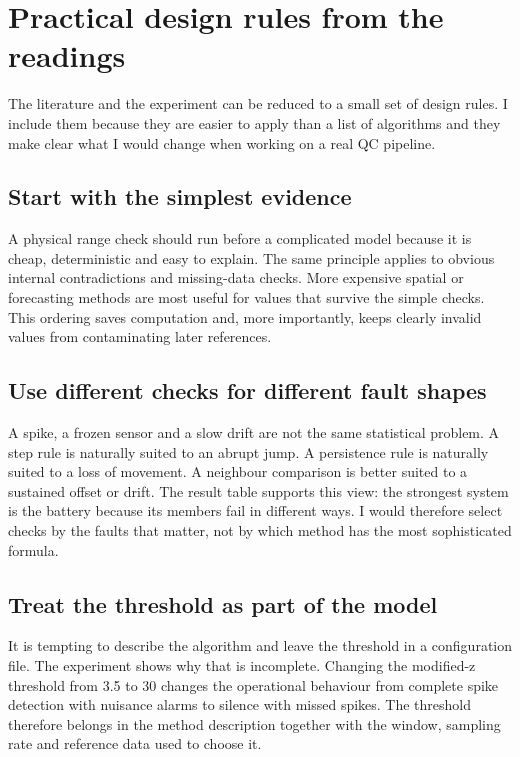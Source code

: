\section{Practical design rules from the readings}
\label{sec:practical}

The literature and the experiment can be reduced to a small set of design
rules. I include them because they are easier to apply than a list of
algorithms and they make clear what I would change when working on a real QC
pipeline.

\subsection{Start with the simplest evidence}

A physical range check should run before a complicated model because it is
cheap, deterministic and easy to explain. The same principle applies to
obvious internal contradictions and missing-data checks. More expensive
spatial or forecasting methods are most useful for values that survive the
simple checks. This ordering saves computation and, more importantly, keeps
clearly invalid values from contaminating later references.

\subsection{Use different checks for different fault shapes}

A spike, a frozen sensor and a slow drift are not the same statistical
problem. A step rule is naturally suited to an abrupt jump. A persistence
rule is naturally suited to a loss of movement. A neighbour comparison is
better suited to a sustained offset or drift. The result table supports this
view: the strongest system is the battery because its members fail in
different ways. I would therefore select checks by the faults that matter,
not by which method has the most sophisticated formula.

\subsection{Treat the threshold as part of the model}

It is tempting to describe the algorithm and leave the threshold in a
configuration file. The experiment shows why that is incomplete. Changing
the modified-z threshold from 3.5 to 30 changes the operational behaviour
from complete spike detection with nuisance alarms to silence with missed
spikes. The threshold therefore belongs in the method description together
with the window, sampling rate and reference data used to choose it.

